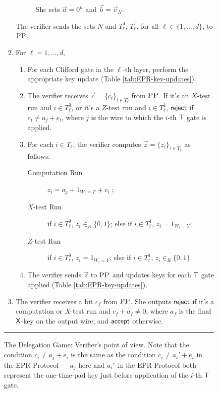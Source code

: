 \begin{figure}[H]
\begin{enumerate}
\begin{description}
She sets $\vec{a} = 0^n$ and $\vec{b} = \vec{e}_N$.
\end{description}
The verifier sends the sets $N$ and $T_\ell^0$, $T_\ell^1$, for all $\ell\in\{1,\ldots,d\}$, to $\textsc{PP}$.
\item For $\ell=1,\dots,d$, 
\begin{enumerate}
  \item For each Clifford gate in the $\ell$-th layer, perform the appropriate
    key update (Table \ref{tab:EPR-key-updates}).
 \item The verifier receives $\vec{c} = \{c_i\}_{i\in T_{\ell}}$ from $\textsc{PP}$. If it's an $X$-test run and $i\in T_\ell^0$, or it's a $Z$-test run and $i\in T_\ell^1$, $\sf reject$ if $c_i\neq a_{j}+ e_i$, where $j$ is the wire to which the $i$-th $\sf T$ gate is applied.
\item For each $i\in T_\ell$, the verifier computes $\vec{z}=\{z_i\}_{i\in T_\ell}$ as follows: 
\begin{description}
\item[Computation Run] $z_i=a_{j}+ 1_{W_i=F} + c_i$ ;
\item[$X$-test Run] if $i\in T_\ell^0$, $z_i\in_R\{0,1\}$; else if $i\in T_\ell^1$, $z_i=1_{W_i=Y}$;
\item[$Z$-test Run] if $i\in T_\ell^0$, $z_i=1_{W_i=Y}$; else if $i\in T_\ell^1$, $z_i\in_R\{0,1\}$.
\end{description}
\item The verifier sends $\vec{z}$ to $\textsc{PP}$ and updates keys for each $\sf T$
  gate applied (Table \ref{tab:EPR-key-updates}).
\end{enumerate} 
\item The verifier receives a bit $c_f$ from $\textsc{PP}$. She outputs $\sf reject$ if it's a computation or $X$-test run and $c_f+ a_f\neq 0$, where $a_f$ is the final $\sf X$-key on the output wire; and $\sf accept$ otherwise.
\end{enumerate}
\rule[2ex]{\textwidth}{0.5pt}\vspace{-.5cm}
\caption{The Delegation Game: Verifier's point of view. Note that the condition $c_i\neq a_j+e_i$ is the same as the condition $c_i\neq a_i'+e_i$ in the EPR Protocol --- $a_j$ here and $a_i'$ in the EPR Protocol both represent the one-time-pad key just before application of the $i$-th $\sf T$ gate.}\label{fig:leash-protocol-V}
\end{figure}

